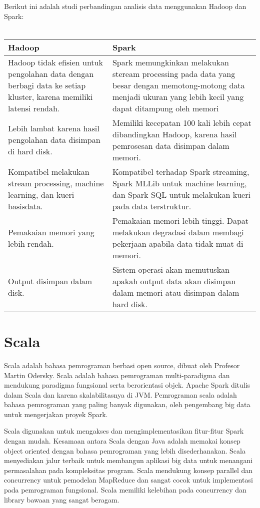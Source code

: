 Berikut ini adalah studi perbandingan analisis data menggunakan Hadoop dan Spark:
\\\\
\begin{tabular}{|p{7.5cm}|p{7.5cm}|}
\hline 
Hadoop & Spark \\ 
\hline 
Hadoop tidak efisien untuk pengolahan data dengan berbagi data ke setiap kluster, karena memiliki latensi rendah. & Spark memungkinkan melakukan steream processing pada data yang besar  dengan memotong-motong data menjadi ukuran yang lebih kecil yang dapat ditampung oleh memori \\ 
\hline 
Lebih lambat karena hasil pengolahan data disimpan di
hard disk. & Memiliki kecepatan 100 kali lebih cepat dibandingkan Hadoop, karena hasil pemrosesan data disimpan dalam memori. \\ 
\hline 
Kompatibel melakukan stream processing, machine learning, dan kueri basisdata. & Kompatibel terhadap Spark streaming, Spark MLLib untuk machine learning,  dan Spark SQL untuk melakukan kueri pada data terstruktur. \\ 
\hline 
Pemakaian memori yang lebih rendah. & Pemakaian memori lebih tinggi. Dapat melakukan degradasi dalam
membagi pekerjaan apabila data tidak muat di memori. \\ 
\hline 
Output disimpan dalam disk. & Sistem operasi akan memutuskan apakah output data akan disimpan dalam memori atau disimpan dalam hard disk. \\ 
\hline 
\end{tabular} 



\section{Scala}
Scala adalah bahasa pemrograman berbasi open source, dibuat oleh Profesor Martin Odersky. Scala adalah bahasa pemrograman multi-paradigma dan mendukung paradigma fungsional serta berorientasi objek. Apache Spark ditulis dalam Scala dan karena skalabilitasnya di JVM. Pemrograman scala adalah bahasa pemrograman yang paling banyak digunakan, oleh pengembang big data untuk mengerjakan proyek Spark.

\par Scala digunakan untuk mengakses dan mengimplementasikan fitur-fitur Spark dengan mudah. Kesamaan antara Scala dengan Java adalah memakai konsep object oriented dengan bahasa pemrograman yang lebih disederhanakan. Scala menyediakan jalur terbaik untuk membangun aplikasi big data untuk menangani permasalahan pada kompleksitas program. Scala mendukung konsep parallel dan concurrency untuk pemodelan MapReduce dan sangat cocok untuk implementasi pada pemrograman fungsional. Scala memiliki kelebihan pada concurrency dan library bawaan yang sangat beragam. 

